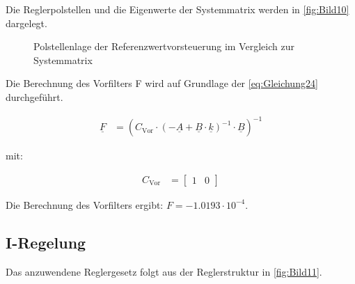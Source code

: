 Die Reglerpolstellen und die Eigenwerte der Systemmatrix werden in \autoref{fig:Bild10} dargelegt.

\begin{figure}[H]
   \centering
   \caption[Polstellenlage der Referenzwertvorsteuerung]{Polstellenlage der Referenzwertvorsteuerung im Vergleich zur Systemmatrix}
   \label{fig:Bild10}
\end{figure}

Die Berechnung des Vorfilters F wird auf Grundlage der \autoref{eq:Gleichung24} durchgeführt.

\begin{align}
    \underline{F} &= \left(C_{\mathrm{Vor}}\cdot\left(-\underline{A}+\underline{B}\cdot\underline{k}\right)^{-1}\cdot\underline{B}\right)^{-1}
    \label{eq:Gleichung24}
\end{align}

mit:

\begin{align*}
    C_{\mathrm{Vor}} &= 
    \begin{bmatrix}
        1 & 0
    \end{bmatrix}
\end{align*}

Die Berechnung des Vorfilters ergibt: $F = -1.0193\cdot 10^{-4}$.

\clearpage

\subsection{I-Regelung} \label{sec:Iregler}

Das anzuwendene Reglergesetz folgt aus der Reglerstruktur in \autoref{fig:Bild11}.

